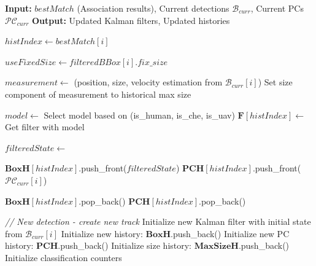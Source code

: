 \documentclass[14pt,a4paper]{article}
\begin{document}
\begin{algorithm}
\caption{KalmanFilterAndUpdateHist - Update Filters and Maintain Histories}
\begin{algorithmic}[1]

\State \textbf{Input:} $bestMatch$ (Association results), Current detections $\mathcal{B}_{curr}$, Current PCs $\mathcal{PC}_{curr}$
\State \textbf{Output:} Updated Kalman filters, Updated histories

        \State $histIndex \gets bestMatch[i]$
        
        \State $useFixedSize \gets filteredBBox[i].fix\_size$
        
        \State $measurement \gets$ (position, size, velocity estimation from $\mathcal{B}_{curr}[i]$)
            \State Set size component of measurement to historical max size
        \EndIf
        
        \State $model \gets$ Select model based on (is\_human, is\_che, is\_uav)
        \State $\mathbf{F}[histIndex] \gets$ Get filter with model
        
        \State {}
        \State {}
        
        \State $filteredState \gets$ 
        
        \State $\mathbf{BoxH}[histIndex]$.push\_front($filteredState$)
        \State $\mathbf{PCH}[histIndex]$.push\_front($\mathcal{PC}_{curr}[i]$)
        
            \State $\mathbf{BoxH}[histIndex]$.pop\_back()
            \State $\mathbf{PCH}[histIndex]$.pop\_back()
        \EndWhile
        
    \Else
        \State \textit{// New detection - create new track}
        \State Initialize new Kalman filter with initial state from $\mathcal{B}_{curr}[i]$
        \State Initialize new history: $\mathbf{BoxH}$.push\_back()
        \State Initialize new PC history: $\mathbf{PCH}$.push\_back()
        \State Initialize size history: $\mathbf{MaxSizeH}$.push\_back()
        \State Initialize classification counters
        
    \EndIf
\EndFor

\end{algorithmic}
\end{algorithm}
\end{document}
